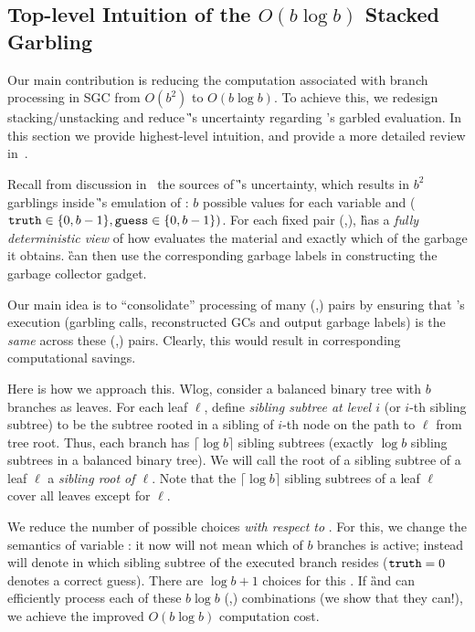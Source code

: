 
\subsection{Top-level Intuition of the $O(b \log b)$ Stacked Garbling}
\label{sec:intuition}

Our main contribution is reducing the computation associated with branch processing in SGC from $O(b^2)$ to $O(b \log b)$.
To achieve this, we redesign stacking/unstacking and reduce \G's uncertainty regarding \E's garbled evaluation.  
In this section we provide highest-level intuition, and provide a more detailed review in~.
 
   Recall from discussion in~ the  sources of \G's uncertainty, which results in $b^2$ garblings inside \G's emulation of \E: $b$ possible values for each variable \truth and \guess ($\mathtt{truth} \in\{0,b-1\}, \mathtt{guess}\in\{0,b-1\})$.
   For each fixed pair  (\truth,\guess), \G has a {\em fully deterministic view} of how \E evaluates the material and exactly which of the garbage it obtains.  \G can then use the corresponding garbage labels in constructing the garbage collector gadget.
   
   Our main idea  is to ``consolidate''  processing of many (\truth,\guess) pairs by ensuring that \E's execution (garbling calls, reconstructed GCs and output garbage labels) is the {\em same} across these (\truth,\guess) pairs.  Clearly, this would result in corresponding computational savings. 
   

  
  Here is how we approach this.  Wlog, consider a balanced binary tree with $b$ branches as leaves. 
  For each leaf $\ell$, define {\em sibling subtree at level $i$} (or  $i$-th  sibling subtree) to be the subtree rooted in a sibling of $i$-th node on the path to $\ell$ from tree root.  Thus, each branch has $\lceil \log b \rceil$ sibling subtrees (exactly $\log b$ sibling subtrees in a balanced binary tree).
  We will call the root of a sibling subtree of a leaf $\ell$ a {\em sibling root of $\ell$}.
  Note that the $\lceil \log b \rceil$ sibling subtrees of a leaf $\ell$ 
  cover all leaves except for $\ell$.
  
    
 We reduce the number of possible \truth choices  {\em with respect to  \guess}.  For this, we  change the semantics of variable \truth: it now will not mean which of $b$ branches is active; instead \truth will denote in which sibling subtree of \guess the executed branch resides ($\mathtt{truth}=0$ denotes a correct guess).  There are $\log b + 1$ choices for this \truth.  If \G and \E can efficiently process each of these $b\log b$  (\truth,\guess) combinations  (we show that they can!), we achieve the improved $O(b\log b)$ computation cost.
  
  
  
 

